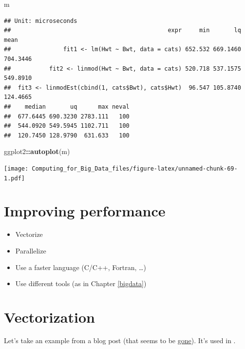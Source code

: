 \documentclass[]{book}
\newenvironment{Shaded}{\begin{snugshade}}{\end{snugshade}}
\newcommand{\KeywordTok}[1]{\textcolor[rgb]{0.13,0.29,0.53}{\textbf{#1}}}
\newcommand{\OperatorTok}[1]{\textcolor[rgb]{0.81,0.36,0.00}{\textbf{#1}}}
\newcommand{\NormalTok}[1]{#1}
\theoremstyle{definition}
\theoremstyle{definition}
\theoremstyle{definition}
\theoremstyle{remark}
\begin{document}
\begin{Shaded}
\begin{Highlighting}[]
\NormalTok{m}
\end{Highlighting}
\end{Shaded}

\begin{verbatim}
## Unit: microseconds
##                                             expr     min       lq     mean
##               fit1 <- lm(Hwt ~ Bwt, data = cats) 652.532 669.1460 704.3446
##           fit2 <- linmod(Hwt ~ Bwt, data = cats) 520.718 537.1575 549.8910
##  fit3 <- linmodEst(cbind(1, cats$Bwt), cats$Hwt)  96.547 105.8740 124.4665
##    median       uq      max neval
##  677.6445 690.3230 2783.111   100
##  544.0920 549.5945 1102.711   100
##  120.7450 128.9790  631.633   100
\end{verbatim}

\begin{Shaded}
\begin{Highlighting}[]
\NormalTok{ggplot2}\OperatorTok{::}\KeywordTok{autoplot}\NormalTok{(m)}
\end{Highlighting}
\end{Shaded}

\texttt{[image: Computing\_for\_Big\_Data\_files/figure-latex/unnamed-chunk-69-1.pdf]}

\section{Improving performance}\label{improving-performance}

\begin{itemize}
\item
  Vectorize
\item
  Parallelize
\item
  Use a faster language (C/C++, Fortran, \ldots{})
\item
  Use different tools (as in Chapter \ref{bigdata})
\end{itemize}

\section{Vectorization}\label{vectorization}

Let's take an example from a blog post (that seems to be
\href{http://www.babelgraph.org/wp/?p=358}{gone}). It's used in
\citet[Section
\href{http://adv-r.had.co.nz/Rcpp.html\#rcpp-case-studies}{Case
studies}]{Wickham2014}.
\end{document}
